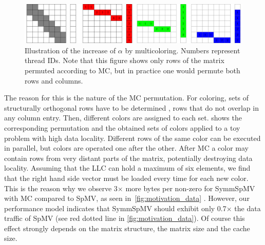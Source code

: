   \begin{figure}[tbp]
  	\centering
  	\includegraphics[scale=0.45]{pics/mc_alpha_problem/mc_alpha_unsymm}
  	\caption{Illustration of the increase of $\alpha$ by multicoloring. Numbers represent thread IDs. Note that this figure shows only rows of the matrix permuted according to \acrshort{MC}, but in practice one would permute both rows and columns.}
  	\label{fig:mc_alpha}
  \end{figure}
  
The reason for this is the nature of the \acrlong{MC}
permutation. For \DTWO coloring, sets of structurally orthogonal
rows have to be determined \cite{dist_k_def}, \ie rows that do not
overlap in any column entry. Then, different colors are assigned to
each set.   shows the corresponding permutation
and the obtained sets of colors applied to a toy problem with high
data locality. Different rows of the same color can be executed in
parallel, but colors are operated one after the
other. After \acrlong{MC} a color may contain rows from very distant
parts of the matrix, potentially destroying data locality.  Assuming
that the \acrfull{LLC} can hold a maximum of six elements, we find
that the right hand side vector must be loaded every time for each
new color. This is the reason why we observe 3$\times$ more bytes
per non-zero for \acrshort{SymmSpMV} with \acrshort{MC} compared
to \acrshort{SpMV}, as seen in~\cref{fig:motivation_data} .  However,
our performance model indicates that \acrshort{SymmSpMV} should
exhibit only 0.7$\times$ the data traffic of \acrshort{SpMV} (see
red dotted line in \cref{fig:motivation_data}). Of course this
effect strongly depends on the matrix structure, the matrix size and
the cache size.
        
